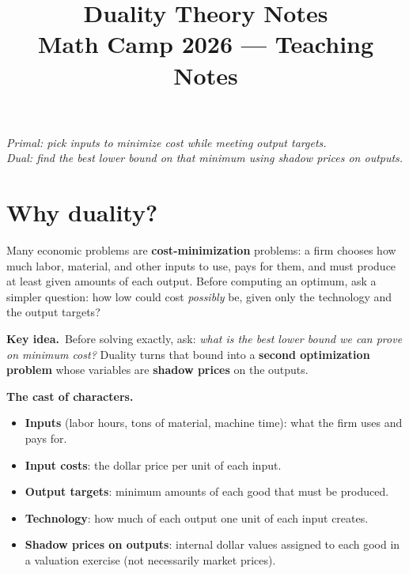 \documentclass[11pt,a4paper]{article}
\title{\textbf{Duality Theory Notes}\\[0.2em]
\large Math Camp 2026 --- Teaching Notes}
\author{}
\date{}
\newcommand{\keyidea}[1]{\medskip\noindent\textbf{Key idea.}\ #1\medskip}
\begin{document}
\maketitle

\begin{center}
\small
\textit{Primal: pick inputs to minimize cost while meeting output targets.\\
Dual: find the best lower bound on that minimum using shadow prices on outputs.}
\end{center}

\tableofcontents
\newpage

\section{Why duality?}

Many economic problems are \textbf{cost-minimization} problems: a firm chooses how much labor, material,
and other inputs to use, pays for them, and must produce at least given amounts of each output.
Before computing an optimum, ask a simpler question: how low could cost \emph{possibly} be, given only
the technology and the output targets?

\keyidea{Before solving exactly, ask: \emph{what is the best lower bound we can prove on minimum cost?}
Duality turns that bound into a \textbf{second optimization problem} whose variables are
\textbf{shadow prices} on the outputs.}

\textbf{The cast of characters.}
\begin{itemize}[nosep,leftmargin=*]
  \item \textbf{Inputs} (labor hours, tons of material, machine time): what the firm uses and pays for.
  \item \textbf{Input costs}: the dollar price per unit of each input.
  \item \textbf{Output targets}: minimum amounts of each good that must be produced.
  \item \textbf{Technology}: how much of each output one unit of each input creates.
  \item \textbf{Shadow prices on outputs}: internal dollar values assigned to each good in a valuation
        exercise (not necessarily market prices).
\end{itemize}
\end{document}
